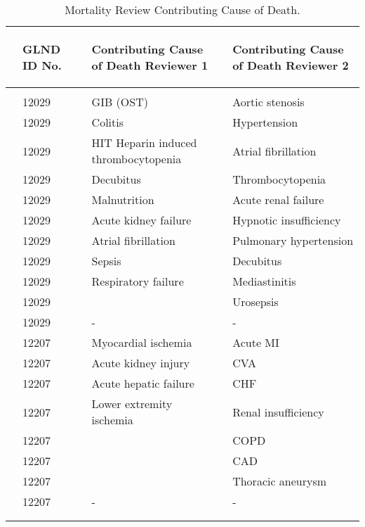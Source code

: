\documentclass[dvips,10pt]{article}
\begin{document}
\begin{table}[t]
\caption
{ Mortality Review Contributing Cause of Death. }
\begin{center}
\begin{tabular}{ @{}l@{}
@{}l@{}@{}p{1.5em}@{}@{}p{1.75in}@{}@{}p{1.5em}@{}@{}p{1.75in}@{}
}
\hline

& \parbox{6em}{\begin{center}GLND ID No.\end{center}} && \parbox{6em}{\begin{center}Contributing Cause of Death Reviewer 1\end{center}} && \parbox{6em}{\begin{center}Contributing Cause of Death Reviewer 2\end{center}} \\

\hline

\\
& 12029 && GIB (OST) && Aortic stenosis \\
& 12029 && Colitis && Hypertension \\
& 12029 && HIT Heparin induced thrombocytopenia && Atrial fibrillation \\
& 12029 && Decubitus && Thrombocytopenia \\
& 12029 && Malnutrition && Acute renal failure \\
& 12029 && Acute kidney failure && Hypnotic insufficiency \\
& 12029 && Atrial fibrillation && Pulmonary hypertension \\
& 12029 && Sepsis && Decubitus \\
& 12029 && Respiratory failure && Mediastinitis \\
& 12029 &&  && Urosepsis \\
& 12029 && - && - \\
& 12207 && Myocardial ischemia && Acute MI \\
& 12207 && Acute kidney injury && CVA \\
& 12207 && Acute hepatic failure && CHF \\
& 12207 && Lower extremity ischemia && Renal insufficiency \\
& 12207 &&  && COPD \\
& 12207 &&  && CAD \\
& 12207 &&  && Thoracic aneurysm \\
& 12207 && - && - \\
\\
\hline \\

\end{tabular}

\end{center}
 \end{table}
\end{document}
